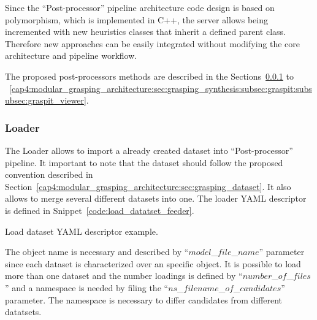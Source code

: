Since the ``Post-processor'' pipeline architecture code design is based on polymorphism, which is implemented in C++, the server allows being incremented with new heuristics classes that inherit a defined parent class. Therefore new approaches can be easily integrated without modifying the core architecture and pipeline workflow. 

The proposed post-processors methods are described in the Sections~\ref{cap4:modular_grasping_architecture:sec:grasping_synthesis:subsec:graspit:subsubsec:loader} to ~\ref{cap4:modular_grasping_architecture:sec:grasping_synthesis:subsec:graspit:subsubsec:graspit_viewer}.

\subsubsection{Loader}
\label{cap4:modular_grasping_architecture:sec:grasping_synthesis:subsec:graspit:subsubsec:loader}

The Loader allows to import a already created dataset into ``Post-processor'' pipeline. It important to note that the dataset should follow the proposed convention described in Section~\ref{cap4:modular_grasping_architecture:sec:grasping_dataset}. It also allows to merge several different datasets into one. The loader YAML descriptor is defined in Snippet~\ref{code:load_datatset_feeder}. %

\begin{snippet}[h!]
\centering
{}
\caption{Load dataset YAML descriptor example.}
\label{code:load_datatset_feeder}
\end{snippet}

The object name is necessary and described by ``$model$\_$file$\_$name$'' parameter since each dataset is characterized over an specific object. It is possible to load more than one dataset and the number loadings is defined by ``$number$\_$of$\_$files$'' and a namespace is needed by filing the ``$ns$\_$filename$\_$of$\_$candidates$'' parameter. The namespace is necessary to differ candidates from different datatsets. 


